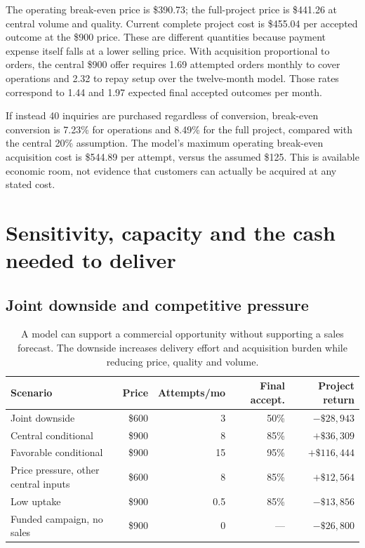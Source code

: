 The operating break-even price is \$390.73; the full-project price is \$441.26 at central volume and quality. Current complete project cost is \$455.04 per accepted outcome at the \$900 price. These are different quantities because payment expense itself falls at a lower selling price. With acquisition proportional to orders, the central \$900 offer requires 1.69 attempted orders monthly to cover operations and 2.32 to repay setup over the twelve-month model. Those rates correspond to 1.44 and 1.97 expected final accepted outcomes per month.

If instead 40 inquiries are purchased regardless of conversion, break-even conversion is 7.23\% for operations and 8.49\% for the full project, compared with the central 20\% assumption. The model's maximum operating break-even acquisition cost is \$544.89 per attempt, versus the assumed \$125. This is available economic room, not evidence that customers can actually be acquired at any stated cost.

\section{Sensitivity, capacity and the cash needed to deliver}
\subsection{Joint downside and competitive pressure}
\begin{table}[htbp]\centering\small
\begin{tabularx}{\linewidth}{@{}Yrrrr@{}}\toprule
Scenario & Price & Attempts/mo & Final accept. & Project return\\\midrule
Joint downside & \$600 & 3 & 50\% & $-\$28,943$\\
Central conditional & \$900 & 8 & 85\% & $+\$36,309$\\
Favorable conditional & \$900 & 15 & 95\% & $+\$116,444$\\
Price pressure, other central inputs & \$600 & 8 & 85\% & $+\$12,564$\\
Low uptake & \$900 & 0.5 & 85\% & $-\$13,856$\\
Funded campaign, no sales & \$900 & 0 & --- & $-\$26,800$\\\bottomrule
\end{tabularx}
\caption{A model can support a commercial opportunity without supporting a sales forecast. The downside increases delivery effort and acquisition burden while reducing price, quality and volume.}
\end{table}

